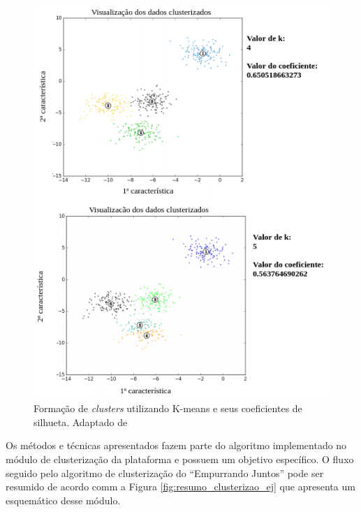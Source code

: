 \begin{figure}[bt!]
\centering
\includegraphics[scale=1]{figuras/exemplo_silhueta.png}
\caption{Formação de \textit{clusters} utilizando K-means e seus coeficientes de silhueta. Adaptado de }
\label{fig:exemplo_silhueta}
\end{figure}

\vfill
\pagebreak

Os métodos e técnicas apresentados fazem parte do algoritmo implementado no módulo de clusterização da plataforma 
e possuem um objetivo específico. O fluxo seguido pelo algoritmo de clusterização do ``Empurrando Juntos'' pode ser resumido de acordo comm
a Figura \ref{fig:resumo_clusterizao_ej} que apresenta um esquemático desse módulo.

